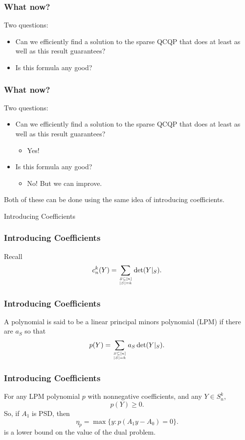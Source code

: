 \documentclass{beamer}
\renewcommand\top[2]{\genfrac{}{}{0pt}{}{#1}{#2}}
\begin{document}
\begin{frame}
    \frametitle{What now?}
    Two questions:
    \begin{itemize}
        \item Can we efficiently find a solution to the sparse QCQP that does at least as well as this result guarantees?
        \pause
        \item Is this formula any good?
    \end{itemize}
\end{frame}
\begin{frame}
    \frametitle{What now?}
    Two questions:
    \begin{itemize}
        \item Can we efficiently find a solution to the sparse QCQP that does at least as well as this result guarantees?
            \begin{itemize}
                \item Yes!
            \end{itemize}

        \item Is this formula any good?
            \begin{itemize}
                \item No! But we can improve.
            \end{itemize}
    \end{itemize}
    Both of these can be done using the same idea of introducing coefficients.
\end{frame}
\begin{frame}
    \centering
    \huge
    {\color{gray}Introducing Coefficients}
\end{frame}
\begin{frame}
    \frametitle{Introducing Coefficients}
    Recall
    \[
        c_n^k(Y) = \sum_{\top{S \subseteq [n]}{|S| = k}}  \det(Y|_S).
    \]
\end{frame}
\begin{frame}
    \frametitle{Introducing Coefficients}
    A polynomial is said to be a linear principal minors polynomial (LPM) if there are $a_S$ so that
    \[
        p(Y) = \sum_{\top{S \subseteq [n]}{|S| = k}} a_S \det(Y|_S).
    \]
\end{frame}
\begin{frame}
    \frametitle{Introducing Coefficients}
    For any LPM polynomial $p$ with nonnegative coefficients, and any $Y \in S^k_n$, 
    \[
        p(Y) \ge 0.
    \]
    \pause
    So, if $A_1$ is PSD, then 
    \[
        \eta_p = \max \{y : p(A_1y-A_0) = 0 \}.
    \]
    is a lower bound on the value of the dual problem.
\end{frame}
\end{document}

